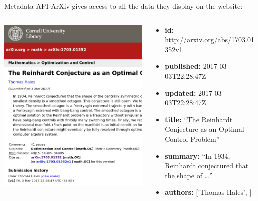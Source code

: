 \documentclass[9pt]{beamer}
\begin{document}
\begin{frame}{Metadata API}
    ArXiv gives access to all the data they display on the website:
    \begin{columns}[T]
        \begin{column}{0.4\textwidth}
    \includegraphics[width=\textwidth]{hales_article.png} 
        \end{column}
        \begin{column}{0.6\textwidth}
            \begin{itemize}
                \item \textbf{id:} http://arxiv.org/abs/1703.01352v1
                \item \textbf{published:} 2017-03-03T22:28:47Z
                \item \textbf{updated:} 2017-03-03T22:28:47Z
                \item \textbf{title:} ``The Reinhardt Conjecture as an Optimal Control Problem''
                \item \textbf{summary:} ``In 1934, Reinhardt conjectured that the shape of \ldots''
                \item \textbf{authors:} ['Thomas Hales', ] 

\end{itemize}
\end{column}
\end{columns}
\end{frame}
\end{document}
